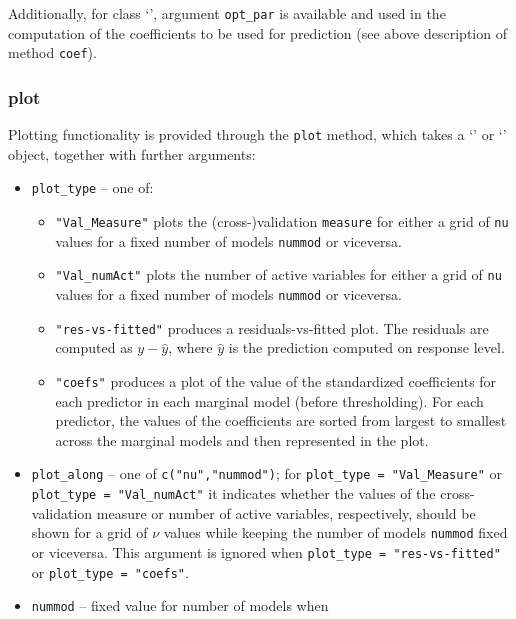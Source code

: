 \documentclass[
  article,
  nojss]{jss}
\newcommand{\class}[1]{`\code{#1}'}
\begin{document}
Additionally, for class \class{spar.cv}, argument \texttt{opt\_par} is
available and used in the computation of the coefficients to be used for
prediction (see above description of method \texttt{coef}).

\subsubsection{plot}\label{plot}

Plotting functionality is provided through the \texttt{plot} method,
which takes a \class{spar} or \class{spar.cv} object, together with
further arguments:

\begin{itemize}
\item
  \texttt{plot\_type} -- one of:

  \begin{itemize}
  \item
    \texttt{"Val\_Measure"} plots the (cross-)validation
    \texttt{measure} for either a grid of \texttt{nu} values for a fixed
    number of models \texttt{nummod} or viceversa.
  \item
    \texttt{"Val\_numAct"} plots the number of active variables for
    either a grid of \texttt{nu} values for a fixed number of models
    \texttt{nummod} or viceversa.
  \item
    \texttt{"res-vs-fitted"} produces a residuals-vs-fitted plot. The
    residuals are computed as \(y- \widehat y\), where \(\widehat y\) is
    the prediction computed on response level.
  \item
    \texttt{"coefs"} produces a plot of the value of the standardized
    coefficients for each predictor in each marginal model (before
    thresholding). For each predictor, the values of the coefficients
    are sorted from largest to smallest across the marginal models and
    then represented in the plot.
  \end{itemize}
\item
  \texttt{plot\_along} -- one of \texttt{c("nu","nummod")}; for
  \texttt{plot\_type\ =\ "Val\_Measure"} or
  \texttt{plot\_type\ =\ "Val\_numAct"} it indicates whether the values
  of the cross-validation measure or number of active variables,
  respectively, should be shown for a grid of \(\nu\) values while
  keeping the number of models \texttt{nummod} fixed or viceversa. This
  argument is ignored when \texttt{plot\_type\ =\ "res-vs-fitted"} or
  \texttt{plot\_type\ =\ "coefs"}.
\item
  \texttt{nummod} -- fixed value for number of models when

\end{itemize}
\end{document}
